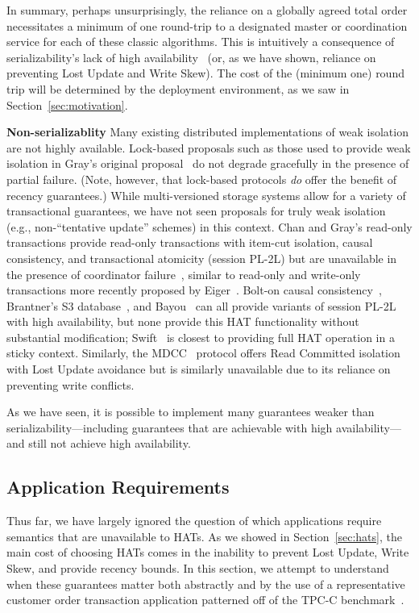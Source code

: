 In summary, perhaps unsurprisingly, the reliance on a globally agreed
total order necessitates a minimum of one round-trip to a designated
master or coordination service for each of these classic algorithms.
This is intuitively a consequence of serializability's lack of high
availability~\cite{davidson-survey} (or, as we have shown, reliance on
preventing Lost Update and Write Skew).  The cost of the (minimum one)
round trip will be determined by the deployment environment, as we saw
in Section~\ref{sec:motivation}.

\vspace{.5em}\noindent\textbf{Non-serializablity} Many existing
distributed implementations of weak isolation are not highly
available. Lock-based proposals such as those used to provide weak
isolation in Gray's original proposal~\cite{gray-isolation} do not
degrade gracefully in the presence of partial failure. (Note, however,
that lock-based protocols \textit{do} offer the benefit of recency
guarantees.) While multi-versioned storage systems allow for a variety
of transactional guarantees, we have not seen proposals for truly weak
isolation (e.g., non-``tentative update'' schemes) in this
context. Chan and Gray's read-only transactions provide read-only
transactions with item-cut isolation, causal consistency, and
transactional atomicity (session PL-2L) but are unavailable in the
presence of coordinator failure~\cite{readonly}, similar to read-only
and write-only transactions more recently proposed by
Eiger~\cite{eiger}.  Bolt-on causal consistency~\cite{bolton},
Brantner's S3 database~\cite{kraska-s3}, and
Bayou~\cite{sessionguarantees} can all provide variants of session
PL-2L with high availability, but none provide this HAT functionality
without substantial modification; Swift~\cite{swift} is closest to
providing full HAT operation in a sticky context. Similarly, the
MDCC~\cite{mdcc} protocol offers Read Committed isolation with Lost
Update avoidance but is similarly unavailable due to its reliance on
preventing write conflicts.

As we have seen, it is possible to implement many guarantees weaker
than serializability---including guarantees that are achievable with
high availability---and still not achieve high availability.

\subsection{Application Requirements}

Thus far, we have largely ignored the question of which applications
require semantics that are unavailable to HATs. As we showed in
Section~\ref{sec:hats}, the main cost of choosing HATs comes in the
inability to prevent Lost Update, Write Skew, and provide recency
bounds. In this section, we attempt to understand when these
guarantees matter both abstractly and by the use of a representative
customer order transaction application patterned off of the TPC-C
benchmark~\cite{tpcc}.


